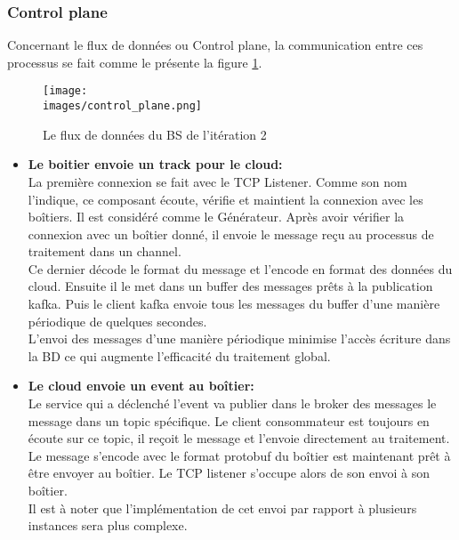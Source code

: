             \subsubsection{Control plane}
             Concernant le flux de données ou Control plane, la communication entre 
             ces processus se fait comme le présente la figure \ref{Figure : controlplane}. \\

             \begin{figure}[ht]
                \centering
                \texttt{[image: \\images/control\_plane.png]}
                \caption{Le flux de données du BS de l'itération 2}
                \label{Figure : controlplane}
            \end{figure}

            \begin{itemize}
                \renewcommand{\labelitemi}{$\bullet$}
                \item \textbf{Le boitier envoie un track pour le cloud:} \\
                La première connexion se fait avec le TCP Listener. 
                Comme son nom l’indique, ce composant écoute, vérifie et  maintient la 
                connexion avec les boîtiers. Il est considéré comme le Générateur. 
                Après avoir vérifier la connexion avec un boîtier donné, il envoie le 
                message reçu au processus de traitement dans un channel. \\
                Ce dernier décode le format du message et l’encode en format des données du 
                cloud. Ensuite il le met dans un buffer des messages prêts à la publication 
                kafka. Puis le client kafka envoie tous les messages du buffer d’une manière 
                périodique de quelques secondes.\\ 
                L’envoi des messages d’une manière périodique minimise l'accès 
                écriture dans la BD ce qui augmente l’efficacité du traitement global. \\
                \item \textbf{ Le cloud envoie un event au boîtier:} \\
                Le service qui a déclenché l’event va publier dans le broker des messages le 
                message dans un topic spécifique. Le client consommateur est toujours en écoute sur ce topic, 
                il reçoit le message et l'envoie directement au traitement. Le message s’encode avec le format 
                protobuf du boîtier est maintenant prêt à être envoyer au boîtier. Le TCP listener s’occupe alors 
                de son envoi à son boîtier. \\
                Il est à noter que l'implémentation de cet envoi par rapport à plusieurs 
                instances sera plus complexe. 
            \end{itemize}
            


